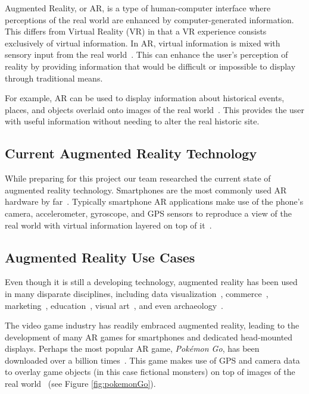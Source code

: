 \documentclass[a4paper, 10pt, american, titlepage]{article}
\begin{document}
Augmented Reality, or AR, is a type of human-computer interface where
perceptions of the real world are enhanced by computer-generated information.
This differs from Virtual Reality (VR) in that a VR experience consists
exclusively of virtual information. In AR, virtual information is mixed with
sensory input from the real world~\autocite{carmigniani2011}. This can enhance
the user's perception of reality by providing information that would be
difficult or impossible to display through traditional means.

For example, AR can be used to display information about historical events,
places, and objects overlaid onto images of the real
world~\autocite{saenz2009}.  This provides the user with useful information
without needing to alter the real historic site.

\subsection{Current Augmented Reality Technology}
\label{sec:currentAugmentedRealityTechnology}

While preparing for this project our team researched the current state of
augmented reality technology. Smartphones are the most commonly used AR hardware
by far~\autocite{boland2018}. Typically smartphone AR applications make use of
the phone's camera, accelerometer, gyroscope, and GPS sensors to reproduce a
view of the real world with virtual information layered on top of
it~\autocite{bonsor2018}.

\subsection{Augmented Reality Use Cases}
\label{sec:augmentedRealityUseCases}

Even though it is still a developing technology, augmented reality has been used
in many disparate disciplines, including data
visualization~\autocite{resnick2017}, commerce~\autocite{matney2018},
marketing~\autocite{sharma2015}, education~\autocite{stewart-smith2012}, visual
art~\autocite{katz2018}, and even archaeology~\autocite{eve2012}.

The video game industry has readily embraced augmented reality, leading to the
development of many AR games for smartphones and dedicated head-mounted
displays. Perhaps the most popular AR game, \textit{Pokémon Go}, has been
downloaded over a billion times~\autocite{webster2018}. This game makes use of
GPS and camera data to overlay game objects (in this case fictional monsters) on
top of images of the real world~\autocite{concepcion2016} (see Figure
\ref{fig:pokemonGo}).
\end{document}
